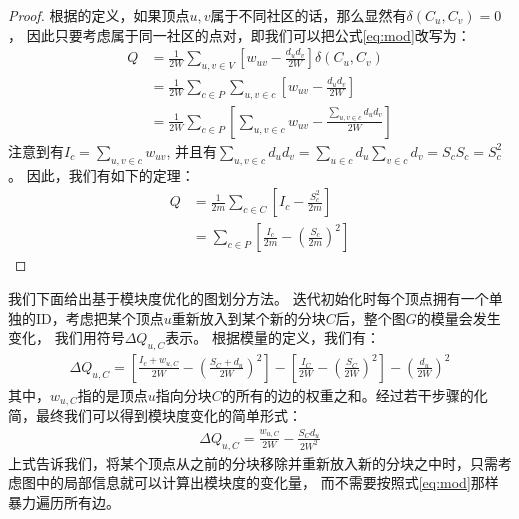 \documentclass[master]{njuthesis}
\begin{document}
\begin{proof}
根据\label{eq:modularity}的定义，如果顶点$u, v$属于不同社区的话，那么显然有$\delta(C_u, C_v)=0$，
因此只要考虑属于同一社区的点对，即我们可以把公式\ref{eq:mod}改写为：
\begin{equation}
\begin{aligned}
Q &= \frac{1}{2W}\sum\limits_{u, v \in V} \left[w_{uv} - \frac{{d_u}{d_v}}{2W} \right]\delta(C_u, C_v) \\
& = \frac{1}{2W}\sum\limits_{c \in P} {\sum\limits_{u, v \in c} { \left[w_{uv} - \frac{{d_u}{d_v}}{2W} \right]}} \\
& = \frac{1}{2W}\sum\limits_{c \in P} \left[{\sum\limits_{u, v \in c} { w_{uv} - \frac{\sum\nolimits_{u,v \in c}{{d_u}{d_v}}}{2W}}}\right] 
\end{aligned}
\end{equation}
注意到有$I_c=\sum\nolimits_{u, v \in c}  w_{uv}$, 
并且有$\sum\nolimits_{u,v \in c}{{d_u}{d_v}} =
\sum\nolimits_{u \in c}{d_u} \sum\nolimits_{v \in c}{d_v} = S_c S_c = {S^2_c}$。
因此，我们有如下的定理：
\begin{equation}
\begin{aligned}
Q &= \frac{1}{2m}\sum\limits_{c \in C} \left[I_c - \frac{S_c^2}{2m} \right] \\
& = \sum\limits_{c \in P} \left[\frac{I_c}{2m} - {\left(\frac{S_c}{2m}\right)}^2 \right]
\end{aligned}
\end{equation}
\end{proof}

我们下面给出基于模块度优化的图划分方法。
迭代初始化时每个顶点拥有一个单独的ID，考虑把某个顶点$u$重新放入到某个新的分块$C$后，整个图$G$的模量会发生变化，
我们用符号$\Delta Q_{u,C}$表示。
根据模量的定义，我们有：
\begin{equation}
\begin{aligned}
 \Delta Q_{u,C}=\left[ \frac{I_c+w_{u,C}}{2W} - {\left(\frac{S_C + d_u}{2W} \right)}^2 \right] -
 \left[ \frac{I_C}{2W} - {\left(\frac{S_C}{2W} \right)}^2 \right] - {\left(\frac{d_u}{2W}\right)}^2 
\end{aligned}
\end{equation}
其中，$w_{u,C}$指的是顶点$u$指向分块$C$的所有的边的权重之和。经过若干步骤的化简，最终我们可以得到模块度变化的简单形式：
\begin{equation}
\begin{aligned}
\label{eq:deltaQ}
 \Delta Q_{u,C}=\frac{w_{u,C}}{2W} - \frac{S_Cd_u}{2W^2} 
\end{aligned}
\end{equation}
上式告诉我们，将某个顶点从之前的分块移除并重新放入新的分块之中时，只需考虑图中的局部信息就可以计算出模块度的变化量，
而不需要按照式\ref{eq:mod}那样暴力遍历所有边。
\end{document}
